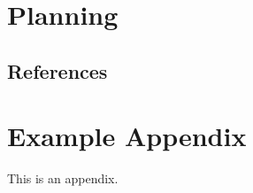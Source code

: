 \documentclass[11pt]{article}
\begin{document}
\section{Planning}
\subsection{References}



\appendix

\section{Example Appendix}
\label{sec:appendix}

This is an appendix.
\end{document}
